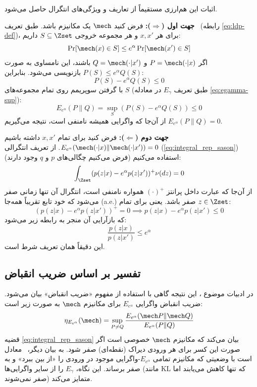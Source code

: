 \begin{اثبات}
اثبات این هم‌ارزی مستقیماً از تعاریف و ویژگی‌های انتگرال حاصل می‌شود.

\textbf{جهت اول ($\Rightarrow$):}
فرض کنید $\mech$ یک مکانیزم \LDP باشد. طبق تعریف \LDP\ (رابطه \ref{eq:ldp-def})، برای هر $x, x'$ و هر مجموعه خروجی $S \subseteq \Zset$ داریم:
\begin{equation}
\Pr[\mech(x) \in S] \le e^\alpha \Pr[\mech(x') \in S]
\end{equation}
اگر $P = \mech(\cdot|x)$ و $Q = \mech(\cdot|x')$ باشند، این نامساوی به صورت $P(S) \le e^\alpha Q(S)$ بازنویسی می‌شود. بنابراین:
\begin{equation}
P(S) - e^\alpha Q(S) \le 0
\end{equation}
با گرفتن سوپریمم روی تمام مجموعه‌های $S$ (طبق تعریف $E_\gamma$ در معادله \eqref{eq:egamma-sup}):
\begin{equation}
E_{e^\alpha}(P \| Q) = \sup_S (P(S) - e^\alpha Q(S)) \le 0
\end{equation}
از آن‌جا که واگرایی همیشه نامنفی است، نتیجه می‌گیریم $E_{e^\alpha}(P \| Q) = 0$.

\textbf{جهت دوم ($\Leftarrow$):}
فرض کنید برای تمام $x, x'$ داشته باشیم $E_{e^\alpha}(\mech(\cdot|x) \| \mech(\cdot|x')) = 0$.
از تعریف انتگرالی (\ref{eq:integral_rep_sason}) استفاده می‌کنیم (فرض می‌کنیم چگالی‌های $p$ و $q$ وجود دارند):
\begin{equation}
\int_{\Zset} (p(z|x) - e^\alpha p(z|x'))^+ \nu(dz) = 0
\end{equation}
از آن‌جا که عبارت داخل پرانتز $( \cdot )^+$ همواره نامنفی است، انتگرال آن تنها زمانی صفر می‌شود که خود تابع تقریباً همه‌جا (a.e.) صفر باشد. یعنی برای تمام $z \in \Zset$:
\begin{equation}
(p(z|x) - e^\alpha p(z|x'))^+ = 0 \implies p(z|x) - e^\alpha p(z|x') \le 0
\end{equation}
که بازآرایی آن منجر به رابطه زیر می‌شود:
\begin{equation}
\frac{p(z|x)}{p(z|x')} \le e^\alpha
\end{equation}
این دقیقاً همان تعریف شرط \LDP است.
\end{اثبات}

\subsection{تفسیر بر اساس ضریب انقباض}
در ادبیات موضوع \cite{Asoodeh2021}، این نتیجه گاهی با استفاده از مفهوم «ضریب انقباض» بیان می‌شود. ضریب انقباض واگرایی $E_{e^\alpha}$ برای مکانیزم $\mech$ به صورت زیر است:
\begin{equation}
\eta_{E_{e^\alpha}}(\mech) = \sup_{P \neq Q} \frac{E_{e^\alpha}(\mech P \| \mech Q)}{E_{e^\alpha}(P \| Q)}
\end{equation}
قضیه \ref{eq:integral_rep_sason} بیان می‌کند که مکانیزم $\mech$ خصوصی است اگر صورت این کسر برای هر ورودی دیراک (نقطه‌ای) صفر شود. به بیان دیگر، \LDP\ معادل است با وضعیتی که مکانیزم تمامی $E_{e^\alpha}$-واگرایی موجود در ورودی را «از بین ببرد» و به صفر برساند. این نگاه، $E_\gamma$ را از سایر واگرایی‌ها (مانند KL که تنها کاهش می‌یابند اما صفر نمی‌شوند) متمایز می‌کند.


